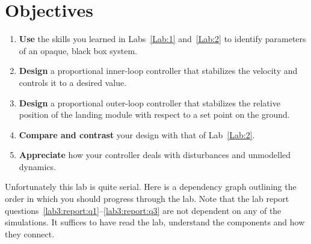 \section{Objectives}
\begin{enumerate}[label=(\arabic*)]
  \item{
    \textbf{Use} the skills you learned in Labs~\ref{Lab:1} and~\ref{Lab:2}
    to identify parameters of an opaque, black box system.
  }
  \item{
    \textbf{Design} a proportional inner-loop controller that stabilizes the velocity and controls it to a desired value.
  }
  \item{
    \textbf{Design} a proportional outer-loop controller that stabilizes the relative position of the landing module with respect to a set point on the ground.
  }
  \item{
    \textbf{Compare and contrast} your design with that of Lab~\ref{Lab:2}.
  }
  \item{
    \textbf{Appreciate} how your controller deals with disturbances and unmodelled dynamics.
  }
\end{enumerate}
Unfortunately this lab is quite serial.
Here is a dependency graph outlining the order in which you should progress through the lab.
Note that the lab report questions~\ref{lab3:report:q1}--\ref{lab3:report:q3} are not dependent on any of the simulations.
It suffices to have read the lab, understand the components and how they connect. 

